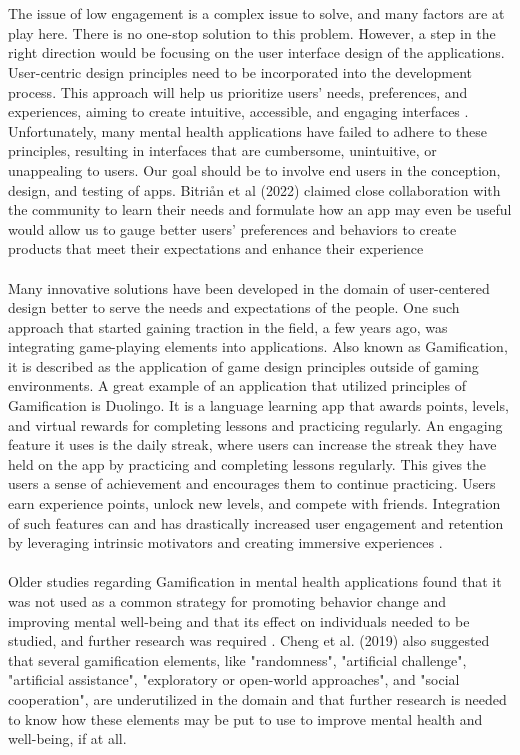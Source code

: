 \documentclass[manuscript,screen,review]{acmart}
\begin{document}
\\ \\ 
The issue of low engagement is a complex issue to solve, and many factors are at play here. There is no one-stop solution to this problem. However, a step in the right direction would be focusing on the user interface design of the applications. User-centric design principles need to be incorporated into the development process. This approach will help us prioritize users' needs, preferences, and experiences, aiming to create intuitive, accessible, and engaging interfaces \cite{Vial22}. Unfortunately, many mental health applications have failed to adhere to these principles, resulting in interfaces that are cumbersome, unintuitive, or unappealing to users. Our goal should be to involve end users in the conception, design, and testing of apps. Bitriån et al \cite{Bitrian21} (2022) claimed close collaboration with the community to learn their needs and formulate how an app may even be useful would allow us to gauge better users' preferences and behaviors to create products that meet their expectations and enhance their experience
\\ \\
Many innovative solutions have been developed in the domain of user-centered design better to serve the needs and expectations of the people. One such approach that started gaining traction in the field, a few years ago, was integrating game-playing elements into applications. Also known as Gamification, it is described as the application of game design principles outside of gaming environments. A great example of an application that utilized principles of Gamification is Duolingo. It is a language learning app that awards points, levels, and virtual rewards for completing lessons and practicing regularly. An engaging feature it uses is the daily streak, where users can increase the streak they have held on the app by practicing and completing lessons regularly. This gives the users a sense of achievement and encourages them to continue practicing. Users earn experience points, unlock new levels, and compete with friends. Integration of such features can and has drastically increased user engagement and retention by leveraging intrinsic motivators and creating immersive experiences \cite{Bitrian21}.
\\ \\
Older studies regarding Gamification in mental health applications found that it was not used as a common strategy for promoting behavior change and improving mental well-being and that its effect on individuals needed to be studied, and further research was required \cite{Edwards16}. Cheng et al. \cite{Cheng19} (2019) also suggested that several gamification elements, like "randomness", "artificial challenge", "artificial assistance", "exploratory or open-world approaches", and "social cooperation", are underutilized in the domain and that further research is needed to know how these elements may be put to use to improve mental health and well-being, if at all.
\end{document}
